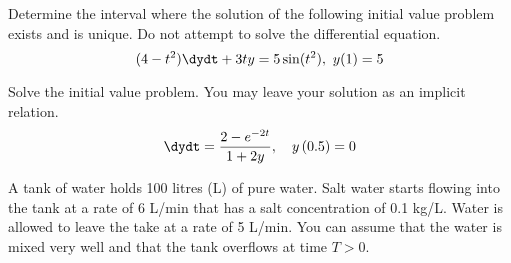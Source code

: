 \documentclass[12pt]{exam}
\begin{document}
    


\newpage

\begin{questions}


\newpage 

\question[3] Determine the interval where the solution of the following initial value problem exists and is unique. Do not attempt to solve the differential equation. $$(4-t^2)\dydt + 3ty= 5 \sin(t^2), \ y(1) = 5$$ %

\vspace{3cm}

\question[7] Solve the initial value problem.  You may leave your solution as an implicit relation. $$\dydt = \frac{2-e^{-2t}}{1+2y}, \quad y\left(0.5 \right) = 0$$ %


    \newpage
    \question[10] A tank of water holds 100 litres (L) of pure water. Salt water starts flowing into the tank at a rate of 6 L/min that has a salt concentration of 0.1 kg/L. Water is allowed to leave the take at a rate of 5 L/min. You can assume that the water is mixed very well and that the tank overflows at time $T>0$.  %


\end{questions}
\end{document}
